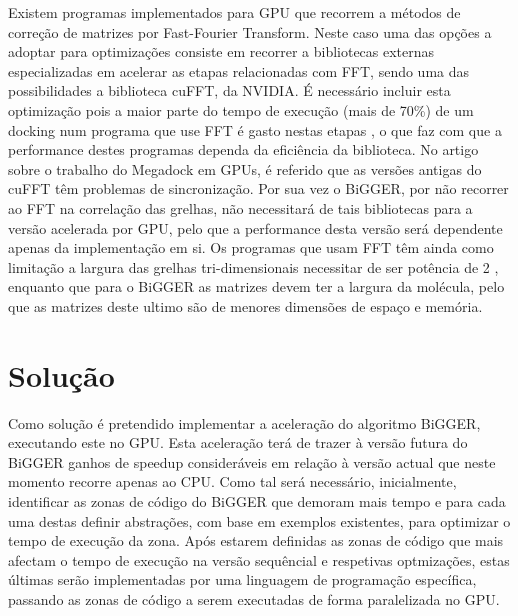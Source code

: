  Existem programas implementados para GPU que recorrem a métodos de correção de matrizes por Fast-Fourier Transform. Neste caso uma das opções a adoptar para optimizações consiste em recorrer a bibliotecas externas especializadas em acelerar as etapas relacionadas com FFT, sendo uma das possibilidades a biblioteca cuFFT, da NVIDIA. É necessário incluir esta optimização pois a maior parte do tempo de execução (mais de 70\%) de um docking num programa que use FFT é gasto nestas etapas\cite{piper2014gpu} \cite{shimoda2015protein}, o que faz com que a performance destes programas dependa da eficiência da biblioteca. No artigo sobre o trabalho do Megadock em GPUs\cite{shimoda2015protein}, é referido que as versões antigas do cuFFT têm problemas de sincronização. Por sua vez o BiGGER, por não recorrer ao FFT na correlação das grelhas, não necessitará de tais bibliotecas para a versão acelerada por GPU, pelo que a performance desta versão será dependente apenas da implementação em si. Os programas que usam FFT têm ainda como limitação a largura das grelhas tri-dimensionais necessitar de ser potência de 2 \cite{biggerPaper}, enquanto que para o BiGGER as matrizes devem ter a largura da molécula, pelo que as matrizes deste ultimo são de menores dimensões de espaço e memória.
%


\section{Solução}
%
%
%
Como solução é pretendido implementar a aceleração do algoritmo BiGGER, executando este no GPU. Esta aceleração terá de trazer à versão futura do BiGGER ganhos de speedup consideráveis em relação à versão actual que neste momento recorre apenas ao CPU. Como tal será necessário, inicialmente, identificar as zonas de código do BiGGER que demoram mais tempo e para cada uma destas definir abstrações, com base em exemplos existentes, para optimizar o tempo de execução da zona. Após estarem definidas as zonas de código que mais afectam o tempo de execução na versão sequêncial e respetivas optmizações, estas últimas serão implementadas por uma linguagem de programação específica, passando as zonas de código a serem executadas de forma paralelizada no GPU.

